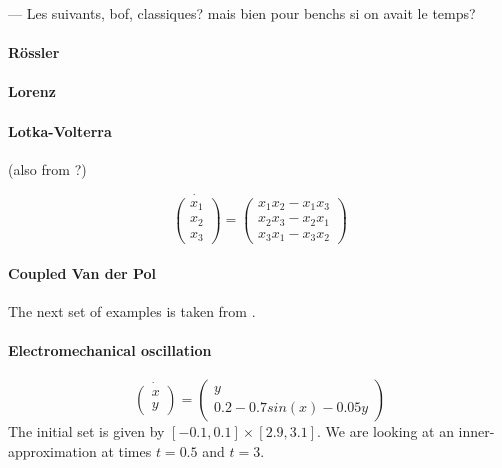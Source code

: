 \documentclass{sig-alternate-05-2015} %
\newcommand\ForAuthors[1]%
 {\par\smallskip                     %
  \begin{center}%
   \fbox%
   {\parbox{0.9\linewidth}%
    {\raggedright\sc--- #1}%
   }%
  \end{center}%
  \par\smallskip                     %
 }
\begin{document}
\ForAuthors{Les suivants, bof, classiques? mais bien pour benchs si on avait le temps?}

\paragraph{R\"ossler}


\paragraph{Lorenz}

\paragraph{Lotka-Volterra}
(also from \cite{underapprox16}?)

\begin{equation}
\dot{\left(\begin{array}{c}
x_1 \\
x_2 \\
x_3
\end{array}\right)} = \left(\begin{array}{c}
x_1x_2-x_1x_3 \\
x_2x_3-x_2x_1 \\
x_3x_1-x_3x_2
\end{array}\right)
\end{equation}

\paragraph{Coupled Van der Pol}

The next set of examples is taken from \cite{underapprox16}. 

\paragraph{Electromechanical oscillation}

\begin{equation}
\dot{\left(\begin{array}{c}
x \\
y
\end{array}\right)} = \left(\begin{array}{c}
y \\
0.2-0.7sin(x)-0.05y
\end{array}\right)
\end{equation}
The initial set is given by $[-0.1,0.1]\times [2.9,3.1]$. We are looking at an 
inner-approximation at times $t=0.5$ and $t=3$. 
\end{document}
